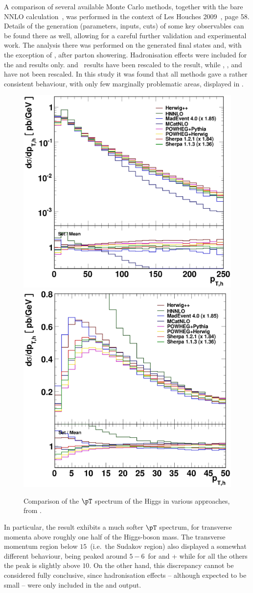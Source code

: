 A comparison of several available Monte Carlo methods, together with the
bare NNLO calculation~\cite{Catani:2007vq}, was performed in the context of 
Les Houches 2009~\cite{Butterworth:2010ym}, page 58.  Details of the 
generation (parameters, inputs, cuts) of some key observables can be found 
there as well, allowing for a careful further validation and experimental 
work.  The analysis there was performed on the generated final
states and, with the exception of \HNNLO, after parton showering.  
Hadronisation effects were included for the \MCatNLO{} and \POWHEG{} results 
only.  \MGME and \sherpa\ results have been rescaled  to the \HNNLO result, 
while \herwigpp, \MCatNLO, and \POWHEG have not been rescaled.  In this study 
it was found that all methods gave a rather consistent behaviour, with only
few marginally problematic areas, displayed in .
\begin{figure}[htb]
\centering
\includegraphics[width=.48\linewidth]{YRHXS_NLOMC/YRHXS_NLOMC_fig1.ps}
\includegraphics[width=.48\linewidth]{YRHXS_NLOMC/YRHXS_NLOMC_fig2.ps}
\caption{Comparison of the $\pT$ spectrum of the
Higgs in various approaches, from .}
\label{fig:ptHLesHouches}
\end{figure}
In particular, the \MCatNLO{} result 
exhibits a much softer $\pT$ spectrum, for transverse
momenta above roughly one half of the Higgs-boson mass. The transverse momentum
region below $15$\UGeV\ (i.e.\ the Sudakov region) also displayed a somewhat 
different behaviour, being peaked around $5{-}6$\UGeV\ for \herwigpp{} and \MGME{}+\pythia{}
while for all the others the peak is slightly above $10$\UGeV. On the other hand,
this discrepancy cannot be considered fully conclusive, since hadronisation
effects -- although expected to be small -- were only included in the 
\MCatNLO and \POWHEG output.

